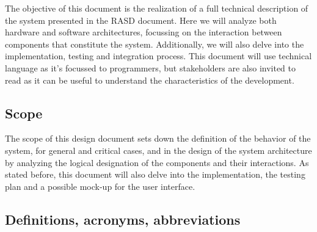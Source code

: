 \documentclass[table, 12pt]{article}
\begin{document}
The objective of this document is the realization of a full technical description of the system presented in the RASD document.
Here we will analyze both hardware and software architectures, focussing on the interaction between components that constitute the system.
Additionally, we will also delve into the implementation, testing and integration process.
This document will use technical language as it's focussed to programmers, but stakeholders are also invited to read as it can be useful to understand the characteristics of the development.

\subsection{Scope}

The scope of this design document sets down the definition of the behavior of the system, for general and critical cases, and in the design of the system architecture by analyzing the logical designation of the components and their interactions.
As stated before, this document will also delve into the implementation, the testing plan and a possible mock-up for the user interface.

\subsection{Definitions, acronyms, abbreviations}
\end{document}

